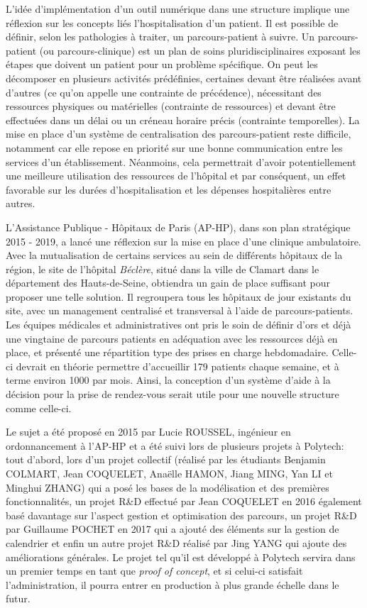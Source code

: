 \documentclass{polytech/polytech}
\begin{document}
L'idée d'implémentation d'un outil numérique dans une structure implique une réflexion sur les concepts liés l'hospitalisation d'un patient. Il est possible de définir, selon les pathologies à traiter, un parcours-patient à suivre. Un parcours-patient (ou parcours-clinique) est un plan de soins pluridisciplinaires exposant les étapes que doivent un patient pour un problème spécifique. On peut les décomposer en plusieurs activités prédéfinies, certaines devant être réalisées avant d'autres (ce qu'on appelle une contrainte de précédence), nécessitant des ressources physiques ou matérielles (contrainte de ressources) et devant être effectuées dans un délai ou un créneau horaire précis (contrainte temporelles). La mise en place d'un système de centralisation des parcours-patient reste difficile, notamment car elle repose en priorité sur une bonne communication entre les services d'un établissement. Néanmoins, cela permettrait d'avoir potentiellement une meilleure utilisation des ressources de l'hôpital et par conséquent, un effet favorable sur les durées d'hospitalisation et les dépenses hospitalières entre autres.

L'Assistance Publique - Hôpitaux de Paris (AP-HP), dans son plan stratégique 2015 - 2019, a lancé une réflexion sur la mise en place d'une clinique ambulatoire. Avec la mutualisation de certains services au sein de différents hôpitaux de la région, le site de l'hôpital \textit{Béclère}, situé dans la ville de Clamart dans le département des Hauts-de-Seine, obtiendra un gain de place suffisant pour proposer une telle solution. Il regroupera tous les hôpitaux de jour existants du site, avec un management centralisé et transversal à l'aide de parcours-patients. Les équipes médicales et administratives ont pris le soin de définir d'ors et déjà une vingtaine de parcours patients en adéquation avec les ressources déjà en place, et présenté une répartition type des prises en charge hebdomadaire. Celle-ci devrait en théorie permettre d'accueillir 179 patients chaque semaine, et à terme environ 1000 par mois. Ainsi, la conception d'un système d'aide à la décision pour la prise de rendez-vous serait utile pour une nouvelle structure comme celle-ci.

Le sujet a été proposé en 2015 par Lucie ROUSSEL, ingénieur en ordonnancement à l'AP-HP et a été suivi lors de plusieurs projets à Polytech: tout d'abord, lors d'un projet collectif (réalisé par les étudiants Benjamin COLMART, Jean COQUELET, Anaëlle HAMON, Jiang MING, Yan LI et Minghui ZHANG) qui a posé les bases de la modélisation et des premières fonctionnalités, un projet R\&D effectué par Jean COQUELET en 2016 également basé davantage sur l'aspect gestion et optimisation des parcours, un projet R\&D par Guillaume POCHET en 2017 qui a ajouté des éléments sur la gestion de calendrier et enfin un autre projet R\&D réalisé par Jing YANG qui ajoute des améliorations générales. Le projet tel qu'il est développé à Polytech servira dans un premier temps en tant que \textit{proof of concept}, et si celui-ci satisfait l'administration, il pourra entrer en production à plus grande échelle dans le futur.
\end{document}

